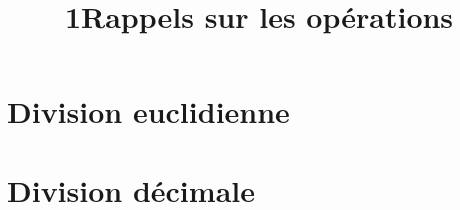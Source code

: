 \documentclass[12pt,a4paper]{article}
\date{}
\title{\textcircled{{\normalsize{1}}}Rappels sur les opérations}
\begin{document}
\maketitle








\section{Division euclidienne}






%
%
%
%
%

\section{Division décimale}




%
%
\end{document}
